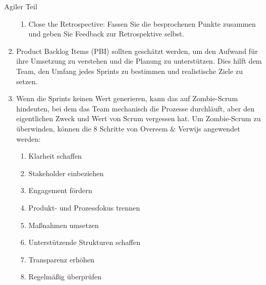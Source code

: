 \documentclass{article}
\begin{document}
\begin{exercise}{Agiler Teil}
\begin{solution}
\begin{enumerate}
\begin{enumerate}
              \item Close the Retrospective: Fassen Sie die besprochenen Punkte zusammen und geben Sie Feedback zur Retrospektive selbst.
            \end{enumerate}
      \item Product Backlog Items (PBI) sollten geschätzt werden, um den Aufwand für ihre Umsetzung zu verstehen und die Planung zu unterstützen. Dies hilft dem Team, den Umfang jedes Sprints zu bestimmen und realistische Ziele zu setzen.
      \item Wenn die Sprints keinen Wert generieren, kann das auf Zombie-Scrum hindeuten, bei dem das Team mechanisch die Prozesse durchläuft, aber den eigentlichen Zweck und Wert von Scrum vergessen hat. Um Zombie-Scrum zu überwinden, können die 8 Schritte von Overeem \& Verwijs angewendet werden:
            \begin{enumerate}
              \item Klarheit schaffen
              \item Stakeholder einbeziehen
              \item Engagement fördern
              \item Produkt- und Prozessfokus trennen
              \item Maßnahmen umsetzen
              \item Unterstützende Strukturen schaffen
              \item Transparenz erhöhen
              \item Regelmäßig überprüfen
            \end{enumerate}
    \end{enumerate}
  \end{solution}
\end{exercise}
\end{document}
